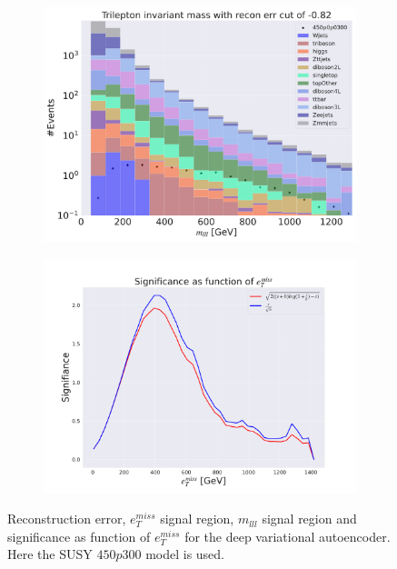 \begin{figure}[H]
\begin{subfigure}{.49\textwidth}
        \caption{}
        \label{fig:VAE_3lep_big_etmiss_450_2}
    \end{subfigure}
    \hfill
    \begin{subfigure}{.49\textwidth}
        \includegraphics[width=\textwidth]{Figures/VAE_testing/big/3lep/b_data_recon_big_rm3_feats_sig_450p0p0300_mlll_recon_errcut_-0.82.pdf}
        \caption{}
        \label{fig:VAE_3lep_big_mlll_450_2}
    \end{subfigure}
    \hfill   
    \begin{subfigure}{.49\textwidth}
        \includegraphics[width=\textwidth]{Figures/VAE_testing/big/3lep/significance_etmiss_450p0p0300_-0.8226861536678497.pdf}
        \caption{}
        \label{fig:VAE_3lep_big_signi_450_2}
    \end{subfigure}
    \hfill      
    \caption[3lep deep network | $450p300$ | VAE | 2]{Reconstruction error, $e_T^{miss}$ signal region, $m_{lll}$ signal region and significance as function of 
    $e_T^{miss}$ for the deep variational autoencoder. Here the SUSY $450p300$ model is used.}
    \label{fig:VAE_3lep_big_rec_sig_signi_450_2}
\end{figure}

